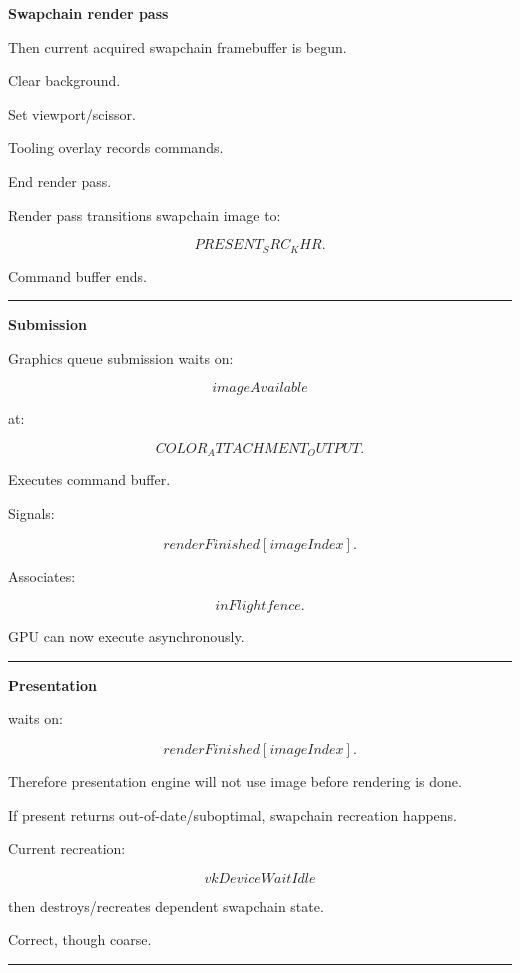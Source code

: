 \textbf{Swapchain render pass}

Then current acquired swapchain framebuffer is begun.

Clear background.

Set viewport/scissor.

Tooling overlay records commands.

End render pass.

Render pass transitions swapchain image to:

\[
PRESENT_SRC_KHR.
\]

Command buffer ends.

\begin{center}\rule{0.5\linewidth}{0.5pt}\end{center}

\textbf{Submission}

Graphics queue submission waits on:

\[
imageAvailable
\]

at:

\[
COLOR_ATTACHMENT_OUTPUT.
\]

Executes command buffer.

Signals:

\[
renderFinished[imageIndex].
\]

Associates:

\[
inFlight fence.
\]

GPU can now execute asynchronously.

\begin{center}\rule{0.5\linewidth}{0.5pt}\end{center}

\textbf{Presentation}

 waits on:

\[
renderFinished[imageIndex].
\]

Therefore presentation engine will not use image before rendering is done.

If present returns out-of-date/suboptimal, swapchain recreation happens.

Current recreation:

\[
vkDeviceWaitIdle
\]

then destroys/recreates dependent swapchain state.

Correct, though coarse.

\begin{center}\rule{0.5\linewidth}{0.5pt}\end{center}

